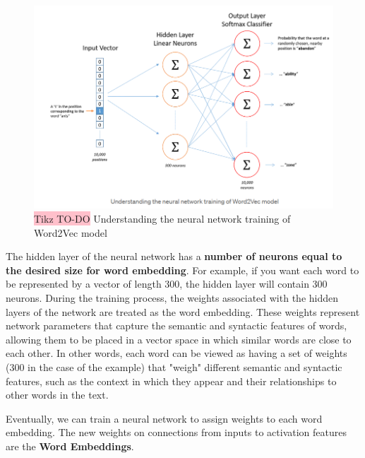 \begin{figure}[!htbp]
    \centering
    \includegraphics[width=0.8\linewidth]{tikz/chapter7 - Word2Vec Architecture.png}
    \caption{{\color{red}\colorbox{pink}{Tikz TO-DO}} Understanding the neural network training of Word2Vec model}
\end{figure}

The hidden layer of the neural network has a \textbf{number of neurons equal to the desired size for word embedding}. For example, if you want each word to be represented by a vector of length 300, the hidden layer will contain 300 neurons. During the training process, the weights associated with the hidden layers of the network are treated as the word embedding. These weights represent network parameters that capture the semantic and syntactic features of words, allowing them to be placed in a vector space in which similar words are close to each other. In other words, each word can be viewed as having a set of weights (300 in the case of the example) that "weigh" different semantic and syntactic features, such as the context in which they appear and their relationships to other words in the text.

Eventually, we can train a neural network to assign weights to each word embedding. The new weights on connections from inputs to activation features are the \textbf{Word Embeddings}.






